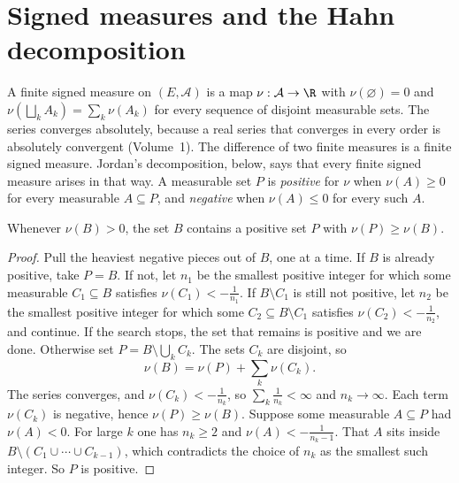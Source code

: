 \section{Signed measures and the Hahn decomposition}

A finite signed measure on $(E,\mathcal A)$ is a map $\nu:\mathcal A\to\R$ with $\nu(\varnothing)=0$ and $\nu(\bigsqcup_kA_k)=\sum_k\nu(A_k)$ for every sequence of disjoint measurable sets. The series converges absolutely, because a real series that converges in every order is absolutely convergent (Volume~1). The difference of two finite measures is a finite signed measure. Jordan's decomposition, below, says that every finite signed measure arises in that way. A measurable set $P$ is \emph{positive} for $\nu$ when $\nu(A)\ge0$ for every measurable $A\subseteq P$, and \emph{negative} when $\nu(A)\le0$ for every such $A$.

\begin{lemma}\label{lem:positivepart}
Whenever $\nu(B)>0$, the set $B$ contains a positive set $P$ with $\nu(P)\ge\nu(B)$.
\end{lemma}
\begin{proof}
Pull the heaviest negative pieces out of $B$, one at a time. If $B$ is already positive, take $P=B$. If not, let $n_1$ be the smallest positive integer for which some measurable $C_1\subseteq B$ satisfies $\nu(C_1)<-\frac1{n_1}$. If $B\setminus C_1$ is still not positive, let $n_2$ be the smallest positive integer for which some $C_2\subseteq B\setminus C_1$ satisfies $\nu(C_2)<-\frac1{n_2}$, and continue. If the search stops, the set that remains is positive and we are done. Otherwise set $P=B\setminus\bigcup_kC_k$. The sets $C_k$ are disjoint, so
\[
\nu(B)=\nu(P)+\sum_k\nu(C_k).
\]
The series converges, and $\nu(C_k)<-\frac1{n_k}$, so $\sum_k\frac1{n_k}<\infty$ and $n_k\to\infty$. Each term $\nu(C_k)$ is negative, hence $\nu(P)\ge\nu(B)$. Suppose some measurable $A\subseteq P$ had $\nu(A)<0$. For large $k$ one has $n_k\ge2$ and $\nu(A)<-\frac1{n_k-1}$. That $A$ sits inside $B\setminus(C_1\cup\cdots\cup C_{k-1})$, which contradicts the choice of $n_k$ as the smallest such integer. So $P$ is positive.
\end{proof}

